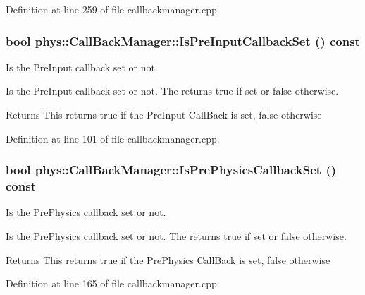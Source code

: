 Definition at line 259 of file callbackmanager.cpp.

\hypertarget{classphys_1_1CallBackManager_adf39c71f0be97bcceb364621d1ccd77e}{
\subsubsection[{IsPreInputCallbackSet}]{\setlength{\rightskip}{0pt plus 5cm}bool phys::CallBackManager::IsPreInputCallbackSet () const}}
\label{d1/d47/classphys_1_1CallBackManager_adf39c71f0be97bcceb364621d1ccd77e}


Is the PreInput callback set or not. 

Is the PreInput callback set or not. The returns true if set or false otherwise. \begin{DoxyReturn}{Returns}
This returns true if the PreInput CallBack is set, false otherwise 
\end{DoxyReturn}


Definition at line 101 of file callbackmanager.cpp.

\hypertarget{classphys_1_1CallBackManager_a8684425c42a4416a204852ce6a246dc6}{
\subsubsection[{IsPrePhysicsCallbackSet}]{\setlength{\rightskip}{0pt plus 5cm}bool phys::CallBackManager::IsPrePhysicsCallbackSet () const}}
\label{d1/d47/classphys_1_1CallBackManager_a8684425c42a4416a204852ce6a246dc6}


Is the PrePhysics callback set or not. 

Is the PrePhysics callback set or not. The returns true if set or false otherwise. \begin{DoxyReturn}{Returns}
This returns true if the PrePhysics CallBack is set, false otherwise 
\end{DoxyReturn}


Definition at line 165 of file callbackmanager.cpp.

